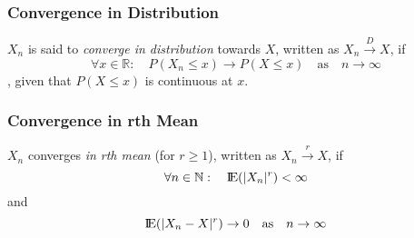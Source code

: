 \documentclass{beamer}
\newcommand{\E}{\mbox{I\negthinspace E}}
\begin{document}
\begin{frame}
\frametitle{Convergence in Distribution}

$X_n$ is said to \textit{converge in distribution} towards $X$, written as $X_n \overset{D}\to X$, if 
\[
\forall x \in \mathbb{R} : \quad P(X_n \leq x) \to P(X \leq x) \quad \text{as} \quad n \to \infty
\]
, given that $P(X \leq x)$ is continuous at $x$.

\end{frame}


\begin{frame}
\frametitle{Convergence in rth Mean}

$X_n$ converges \textit{in rth mean} (for $r \geq 1$), written as $X_n \overset{r}\to X$, if 
\[
\forall n \in \mathbb{N}: \quad \E{(|X_n|^r)} < \infty 
\] and 
\[
\E{(|X_n - X|^r)} \to 0 \quad \text{as} \quad n \to \infty
\]

\end{frame}




\end{document}
